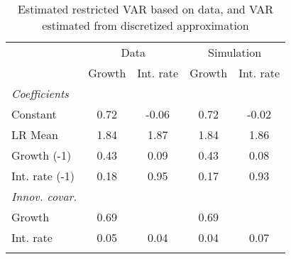 \begin{table}[htbp] 
	\centering
	\begin{tabular}{@{\extracolsep{4pt}}lcccc@{}}		\hline\hline
		 		 & \multicolumn{2}{c}{Data} &\multicolumn{2}{c}{Simulation} \\ 
 		 & Growth 	 & Int. rate 	 & Growth 	 & Int. rate\\\cline{2-3}\cline{4-5}
\rule{0pt}{4ex} 
 \emph{Coefficients} 	  		 & 		 & 		 & 		 &\\ 
\quad Constant 	 & 0.72 	 & -0.06 	 & 0.72 	 & -0.02	 \\ 
\quad LR Mean 	 & 1.84 	 & 1.87 	 & 1.84 	 & 1.86	 \\ 
\quad Growth (-1) 	 &0.43 	 & 0.09 	 & 0.43 	 & 0.08	 \\ 
\quad Int. rate (-1) 	 &0.18 	 & 0.95 	 & 0.17 	 & 0.93	 \\ 
\rule{0pt}{4ex} \emph{Innov. covar.}  	 & 	 & 	 & 	 &\\ 
\quad Growth 	 &0.69 	 &  	 & 0.69 	 & 	 \\ 
\quad Int. rate 	 &0.05 	 & 0.04 	 & 0.04 	 & 0.07	 \\ 
 \hline \rule{0pt}{4ex} 
  
 \hline 	\end{tabular}		\caption{Estimated restricted VAR based on data, and VAR estimated from discretized approximation}
		\label{tab:USA_var_tab_disc}

\end{table}